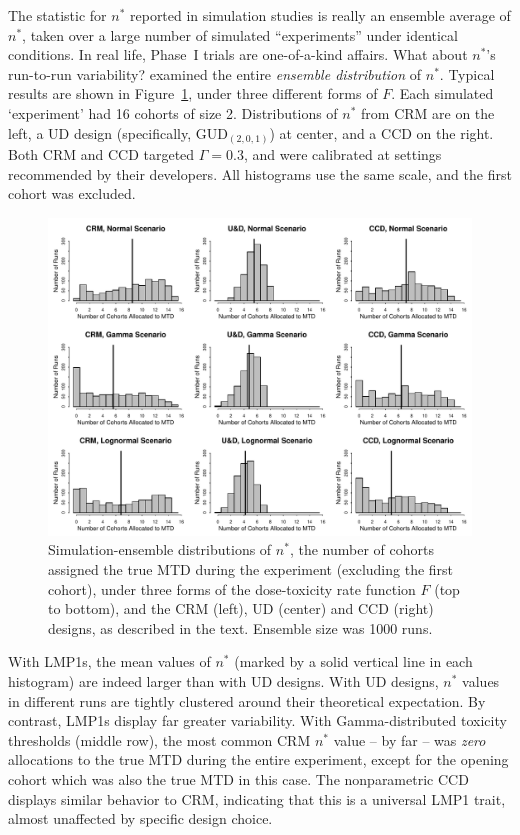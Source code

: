 The statistic for $n^*$ reported in simulation studies is really an ensemble average of $n^*$, taken over a large number of simulated ``experiments'' under identical conditions. In real life, Phase~I trials are one-of-a-kind affairs. What about $n^*$'s run-to-run variability? \citep{Oron:Hoff:smal:2013} examined the entire \emph{ensemble distribution} of $n^*$. Typical results are shown in Figure~\ref{fig:nstar}, under three different forms of $F$. Each simulated `experiment' had 16 cohorts of size 2. Distributions of $n^*$ from CRM are on the left, a UD design (specifically, GUD$_{(2,0,1)}$) at center, and a CCD on the right. Both CRM and CCD targeted $\Gamma=0.3$, and were calibrated at settings recommended by their developers. All histograms use the same scale, and the first cohort was excluded.
%
\begin{figure}[!ht]
\begin{center}
\includegraphics[scale=0.73]{nstar}
\end{center}
\caption{Simulation-ensemble distributions of $n^*$, the number of cohorts assigned the true MTD during the experiment  (excluding the first cohort), under three forms of the dose-toxicity rate function $F$ (top to bottom), and the CRM (left),  UD (center) and CCD (right) designs, as described in the text. Ensemble size was 1000 runs.}\label{fig:nstar}
\end{figure}

With LMP1s, the mean values of $n^*$ (marked by a solid vertical line in each histogram) are indeed larger than with UD designs. With UD designs, $n^*$ values in different runs are tightly clustered around their theoretical expectation. By contrast, LMP1s display far greater variability. With Gamma-distributed toxicity thresholds (middle row), the most common CRM $n^*$ value -- by far -- was \emph{zero} allocations to the true MTD during the entire experiment, except for the opening cohort which was also the true MTD in this case. The nonparametric CCD displays similar behavior to CRM, indicating that this is a universal LMP1 trait, almost unaffected by specific design choice.

